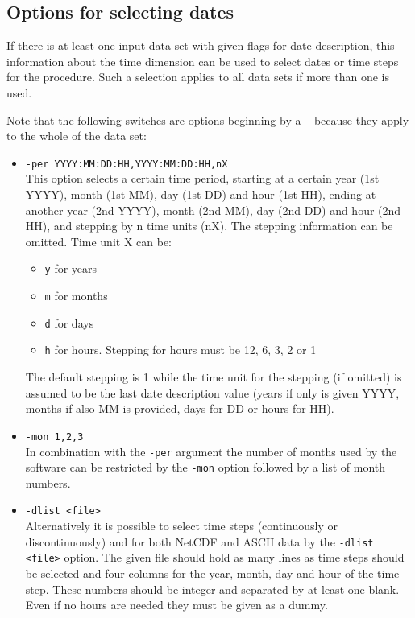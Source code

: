 \documentclass[12pt, oneside, a4paper, headsepline, plainheadsepline]{scrbook}
\begin{document}
\subsection{Options for selecting dates}

If there is at least one input data set with given flags for date description, this 
information about the time dimension can be used to select dates or time steps for the 
procedure. Such a selection applies to all data sets if more than one is used.

Note that the following switches are options beginning by a \verb+-+ because they apply to 
the whole of the data set:
\begin{itemize}

\item \verb+-per YYYY:MM:DD:HH,YYYY:MM:DD:HH,nX+ \\
		This option selects a certain time period, starting at
		a certain year (1st YYYY), month (1st MM), day (1st DD) and hour (1st HH),
		ending at another year (2nd YYYY), month (2nd MM), day (2nd DD) and hour (2nd HH),
		and stepping by n time units (nX). The stepping information can be omitted. Time unit X can be:
		\begin{itemize}
		\item \verb+y+ for years
		\item \verb+m+ for months
		\item \verb+d+ for days
		\item \verb+h+ for hours. Stepping for hours must be 12, 6, 3, 2 or 1
		\end{itemize}
		The default stepping is 1 while the time unit for the stepping (if omitted) is assumed 
		to be the last date description value (years if only is given YYYY, months if also MM is provided, days for DD or hours for HH).

\item \verb+-mon 1,2,3+ \\
		In combination with the \verb+-per+ argument the number of months used by the software can be restricted by the 
		\verb+-mon+ option followed by a list of month numbers. 

\item \verb+-dlist <file>+ \\
		Alternatively it is possible to select time steps (continuously or discontinuously) 
		and for both NetCDF and ASCII data by the \verb+-dlist <file>+ option.
		The given file should hold as many lines as time steps should be selected and
		four columns for the year, month, day and hour of the time step. These
		numbers should be integer and separated by at least one blank.
		Even if no hours are needed they must be given as a dummy.
\end{itemize}
\end{document}
